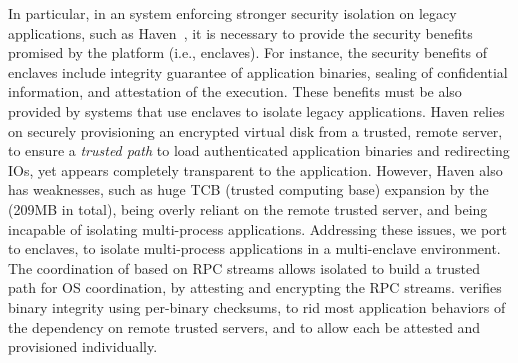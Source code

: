 

In particular, in an system enforcing stronger security isolation
on legacy applications,
such as Haven~\citep{baumann14haven},
it is necessary
to provide the security benefits promised by the platform
(i.e., \intel{} \sgx{} enclaves).
For instance,
the security benefits of enclaves
include integrity guarantee of application binaries,
sealing of confidential information,
and attestation of the execution.
These benefits must be also provided by systems that use enclaves to isolate legacy applications.
Haven relies on
securely provisioning an encrypted virtual disk
from a trusted, remote server,
to ensure a \emph{trusted path} to
load authenticated application binaries
and redirecting IOs,
yet appears
completely transparent to the application.
However, Haven also has weaknesses, such as huge TCB (trusted computing base)
expansion by the \libos{} (209MB in total),
being overly reliant on the remote trusted server,
and being incapable of isolating multi-process applications.
Addressing these issues,
we port \graphene{} to \intel{} \sgx{} enclaves,
to isolate multi-process applications in a multi-enclave environment.
The coordination of \graphene{} based on RPC streams
allows isolated \picoprocs{} to build a trusted path for OS coordination,
by attesting and encrypting the RPC streams.
\graphene{} verifies binary integrity using per-binary checksums,
to rid most application behaviors
of the dependency on remote trusted servers,
and to allow each \picoprocs{} be attested and provisioned individually.




